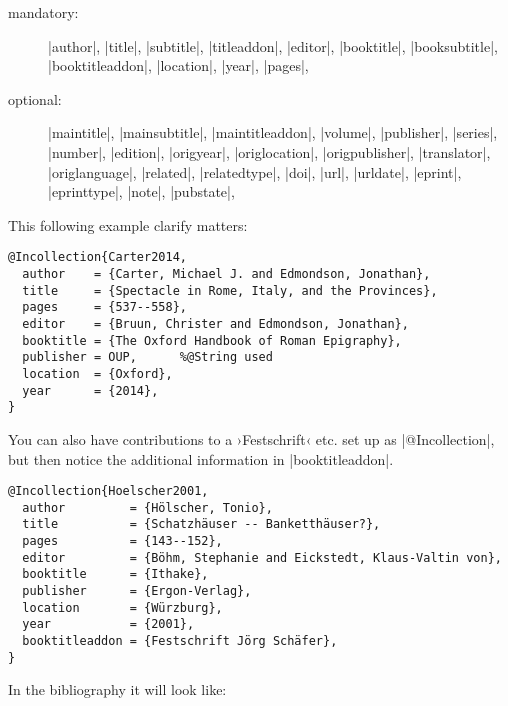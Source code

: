 \documentclass[a4paper,
10pt,
greek,
french,
spanish,
italian,
ngerman,
english
]{ltxdoc}
\begin{document}
\begin{description}
\item[mandatory:] 
|author|, |title|, |subtitle|, |titleaddon|,
|editor|,  |booktitle|, |booksubtitle|, |booktitleaddon|,
|location|, |year|, |pages|, 
\item[optional:]
|maintitle|, |mainsubtitle|, |maintitleaddon|, |volume|, 
|publisher|, |series|, |number|, |edition|, 
|origyear|, |origlocation|, |origpublisher|, 
|translator|, |origlanguage|,
|related|, |relatedtype|,
|doi|, |url|, |urldate|, |eprint|, |eprinttype|, |note|, |pubstate|, 
 \end{description}
 
 
 
This following example clarify matters:
 \begin{lstlisting}[style=bibentry,label=Carter2014,caption={{@}Incollection\{Carter2014,…\} }]
@Incollection{Carter2014,
  author    = {Carter, Michael J. and Edmondson, Jonathan},
  title     = {Spectacle in Rome, Italy, and the Provinces},
  pages     = {537--558},
  editor    = {Bruun, Christer and Edmondson, Jonathan},
  booktitle = {The Oxford Handbook of Roman Epigraphy},
  publisher = OUP,		%@String used
  location  = {Oxford},
  year      = {2014},
}
\end{lstlisting}


You can also have contributions to a ›Festschrift‹ etc. set up as |@Incollection|,
but then notice the additional information in |booktitleaddon|.
\begin{lstlisting}[style=bibentry,label=Hoelscher2001,caption={{@}Incollection\{Hoelscher2001,…\} }]
@Incollection{Hoelscher2001,
  author         = {Hölscher, Tonio},
  title          = {Schatzhäuser -- Banketthäuser?},
  pages          = {143--152},
  editor         = {Böhm, Stephanie and Eickstedt, Klaus-Valtin von},
  booktitle      = {Ithake},
  publisher      = {Ergon-Verlag},
  location       = {Würzburg},
  year           = {2001},
  booktitleaddon = {Festschrift Jörg Schäfer},
}
\end{lstlisting}
In the bibliography it will look like:
\end{document}
